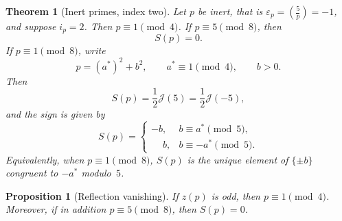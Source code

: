 \documentclass[11pt]{amsart}
\theoremstyle{plain}
\newtheorem{proposition}[theorem]{Proposition}
\newtheorem{mainthm}{Theorem}
\theoremstyle{definition}
\newcommand{\leg}[2]{\left(\frac{#1}{#2}\right)}
\newcommand{\Jac}{\mathcal{J}}
\begin{document}
\begin{mainthm}[Inert primes, index two]\label{thm:B}
Let $p$ be inert, that is $\varepsilon_p=\leg5p=-1$, and suppose
$i_p=2$. Then $p\equiv1\pmod4$. If $p\equiv5\pmod8$, then
\[
  S(p)=0.
\]
If $p\equiv1\pmod8$, write
\[
  p=(a^{*})^2+b^2,\qquad a^{*}\equiv1\pmod4,\qquad b>0.
\]
Then
\[
  S(p)=\frac12\Jac(5)=\frac12\Jac(-5),
\]
and the sign is given by
\[
  S(p)=
  \begin{cases}
    -b,& b\equiv a^{*}\pmod5,\\
    \phantom{-}b,& b\equiv -a^{*}\pmod5.
  \end{cases}
\]
Equivalently, when $p\equiv1\pmod8$, $S(p)$ is the unique element of
$\{\pm b\}$ congruent to $-a^{*}$ modulo~$5$.
\end{mainthm}

\begin{proposition}[Reflection vanishing]\label{prop:reflection-vanishing}
If $z(p)$ is odd, then $p\equiv1\pmod4$. Moreover, if in addition $p\equiv5\pmod8$,
then $S(p)=0$.
\end{proposition}
\end{document}
